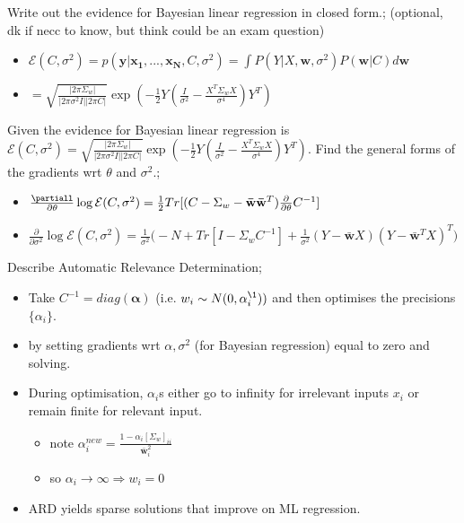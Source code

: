 \documentclass{article}
\begin{document}
Write out the evidence for Bayesian linear regression in closed form.; (optional, dk if necc to know, but think could be an exam question) \begin{itemize} \item $\mathcal{E}(C,\sigma^2)=p(\mathbf{y|x_1,...,x_N}, C, \sigma^2)=\int P(Y|X, \mathbf{w}, \sigma^2)P(\mathbf{w}|C)d\mathbf{w}$ \item $=\sqrt{\frac{|2\pi\Sigma_w|}{|2\pi\sigma^2I||2\pi C|}}\exp(-\frac{1}{2}Y(\frac{I}{\sigma^2}-\frac{X^T\Sigma_w X}{\sigma^4})Y^T)$ \end{itemize}

Given the evidence for Bayesian linear regression is $\mathcal{E}(C,\sigma^2)=\sqrt{\frac{|2\pi\Sigma_w|}{|2\pi\sigma^2I||2\pi C|}}\exp(-\frac{1}{2}Y(\frac{I}{\sigma^2}-\frac{X^T\Sigma_w X}{\sigma^4})Y^T)$. Find the general forms of the gradients wrt $\theta$ and $\sigma^2$.; \begin{itemize} \item $\frac{\partiall}{\partial\theta}\log\mathcal{E}(C,\sigma^2)=\frac{1}{2}Tr[(C-\Sigma_w-\mathbf{\bar{w}\bar{w}}^T)\frac{\partial}{\partial\theta}C^{-1}]$ \item $\frac{\partial}{\partial\sigma^2}\log\mathcal{E}(C,\sigma^2)=\frac{1}{\sigma^2}\big(-N+Tr[I-\Sigma_wC^{-1}]+\frac{1}{\sigma^2}(Y-\mathbf{\bar{w}}X)(Y-\mathbf{\bar{w}}^TX)^T\big )$ \end{itemize}

Describe Automatic Relevance Determination; \begin{itemize} \item Take $C^{-1}=diag(\mathbf{\alpha})$ (i.e. $w_i\sim N(0, \alpha_i^{\1}))$ and then optimises the precisions $\{\alpha_i\}$.  \item by setting gradients wrt $\alpha, \sigma^2$ (for Bayesian regression) equal to zero and solving.  \item During optimisation, $\alpha_i$s either go to infinity for irrelevant inputs $x_i$ or remain finite for relevant input.  \begin{itemize} \item note $\alpha_i^{new}=\frac{1-\alpha_i[\Sigma_w]_{ii}}{\mathbf{\bar{w}}^2_i}$ \item so $\alpha_i\rightarrow\infty\Rightarrow w_i = 0$ \end{itemize} \item ARD yields sparse solutions that improve on ML regression.  \end{itemize}
\end{document}
